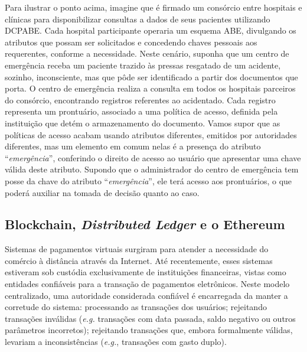 \documentclass[a4paper,11pt]{article}
\begin{document}
Para ilustrar o ponto acima, imagine que é firmado um consórcio entre hospitais e clínicas para disponibilizar consultas a dados de seus pacientes utilizando DCPABE.
Cada hospital participante operaria um esquema ABE, divulgando os atributos que possam ser solicitados e concedendo chaves pessoais aos requerentes, conforme a necessidade.
Neste cenário, suponha que um centro de emergência receba um paciente trazido às pressas resgatado de um acidente, sozinho, inconsciente, mas que pôde ser identificado a partir dos documentos que porta.
O centro de emergência realiza a consulta em todos os hospitais parceiros do consórcio, encontrando registros referentes ao acidentado.
Cada registro representa um prontuário, associado a uma política de acesso, definida pela instituição que detém o armazenamento do documento.
Vamos supor que as políticas de acesso acabam usando atributos diferentes, emitidos por autoridades diferentes, mas um elemento em comum nelas é a presença do atributo ``\emph{emergência}'', conferindo o direito de acesso ao usuário que apresentar uma chave válida deste atributo.
Supondo que o administrador do centro de emergência tem posse da chave do atributo ``\emph{emergência}'', ele terá acesso aos prontuários, o que poderá auxiliar na tomada de decisão quanto ao caso.


\subsection{Blockchain, \emph{Distributed Ledger} e o Ethereum}


Sistemas de pagamentos virtuais surgiram para atender a necessidade do comércio à distância através da Internet. Até recentemente, esses sistemas estiveram sob custódia exclusivamente de instituições financeiras, vistas como entidades confiáveis para a transação de pagamentos eletrônicos.
Neste modelo centralizado, uma autoridade considerada confiável é encarregada da manter a corretude do sistema: processando as transações dos usuários; rejeitando transações inválidas (\emph{e.g.} transações com data passada, saldo negativo ou outros parâmetros incorretos); rejeitando transações que, embora formalmente válidas, levariam a inconsistências (\emph{e.g.}, transações com gasto duplo).
\end{document}
